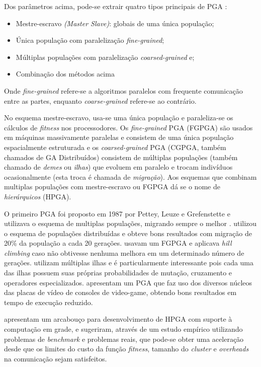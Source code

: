 \documentclass[12pt]{article}
\begin{document}
Dos parâmetros acima, pode-se extrair quatro tipos principais de PGA \cite{cantu1998}: 
\begin{itemize}
  \item Mestre-escravo \emph{(Master Slave)}: globais de uma única população;
  \item Única população com paralelização \emph{fine-grained};
  \item Múltiplas populações com paralelização \emph{coarsed-grained} e;
  \item Combinação dos métodos acima
\end{itemize}
Onde \emph{fine-grained} refere-se a algoritmos paralelos com frequente comunicação entre as partes, enquanto \emph{coarse-grained} refere-se ao contrário.

No esquema mestre-escravo, usa-se uma única população e paraleliza-se os cálculos de \emph{fitness} nos processodores. Os \emph{fine-grained} PGA (FGPGA) são usados em máquinas massivamente paralelas e consistem de uma única população espacialmente estruturada e os \emph{coarsed-grained} PGA (CGPGA, também chamados de GA Distribuídos) consistem de múltiplas populações (também chamado de \emph{demes} ou \emph{ilhas}) que evoluem em paralelo e trocam indivíduos ocasionalmente (esta troca é chamada de \emph{migração}). Aos esquemas que combinam multiplas populações com mestre-escravo ou FGPGA dá se o nome de \emph{hierárquicos} (HPGA).

O primeiro PGA foi proposto em 1987 por Pettey, Leuze e Grefenstette e utilizava o esquema de multiplas populações, migrando sempre o melhor \cite{albasurvey}. \cite{tanese1989} utilizou o esquema de populações distribuídas e obteve bons resultados com migração de 20\% da população a cada 20 gerações. \cite{asparagos1989} usavam um FGPGA e aplicava \emph{hill climbing} caso não obtivesse nenhuma melhora em um determinado número de gerações. \cite{adamidis1996} utilizam múltiplas ilhas e é particularmente interessante pois cada uma das ilhas possuem suas próprias probabilidades de mutação, cruzamento e operadores especializados. \cite{wilson2010} apresentam um PGA que faz uso dos diversos núcleos das placas de vídeo de consoles de video-game, obtendo bons resultados em tempo de execução reduzido.

\cite{lim2007} apresentam um arcabouço para desenvolvimento de HPGA com suporte à computação em grade, e sugeriram, através de um estudo empírico utilizando problemas de \emph{benchmark} e problemas reais, que pode-se obter uma aceleração desde que os limites do custo da função \emph{fitness}, tamanho do \emph{cluster} e \emph{overheads} na comunicação sejam satisfeitos.
\end{document}
